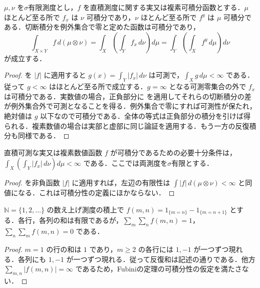 \begin{prop}[Fubiniの定理]
$\mu,\nu$ を$\sigma$有限測度とし，$f$ を直積測度に関する実又は複素可積分函数とする．$\mu$ ほとんど至る所で $f_x$ は $\nu$ 可積分であり，$\nu$ ほとんど至る所で $f^y$ は $\mu$ 可積分である．切断積分を例外集合で零と定めた函数は可積分であり，
\[
\int_{X\times Y}f\,d(\mu\otimes\nu)=\int_X\left(\int_Y f_x\,d\nu\right)d\mu=\int_Y\left(\int_X f^y\,d\mu\right)d\nu
\]
が成立する．
\end{prop}
\begin{proof}
 を $|f|$ に適用すると $g(x)=\int_Y |f_x|\,d\nu$ は可測で，$\int_X g\,d\mu<\infty$ である．従って $g<\infty$ はほとんど至る所で成立する．$g=\infty$ となる可測零集合の外で $f_x$ は可積分である．実数値の場合，正負部分に  を適用してそれらの切断積分の差が例外集合外で可測となることを得る．例外集合で零にすれば可測性が保たれ，絶対値は $g$ 以下なので可積分である．全体の等式は正負部分の積分を引けば得られる．複素数値の場合は実部と虚部に同じ論証を適用する．もう一方の反復積分も同様である．
\end{proof}
\begin{prop}[積分可能性の切断判定]
直積可測な実又は複素数値函数 $f$ が可積分であるための必要十分条件は，$\int_X(\int_Y|f_x|\,d\nu)d\mu<\infty$ である．ここでは両測度を$\sigma$有限とする．
\end{prop}
\begin{proof}
 を非負函数 $|f|$ に適用すれば，左辺の有限性は $\int|f|\,d(\mu\otimes\nu)<\infty$ と同値になる．これは可積分性の定義にほかならない．
\end{proof}
\begin{example}[絶対可積分性がない反復積分]
$\mathbb N=\{1,2,\ldots\}$ の数え上げ測度の積上で $f(m,n)=1_{\{m=n\}}-1_{\{m=n+1\}}$ とする．各行，各列の和は有限であるが，$\sum_m\sum_n f(m,n)=1$，$\sum_n\sum_m f(m,n)=0$ である．
\end{example}
\begin{proof}
$m=1$ の行の和は $1$ であり，$m\geq2$ の各行には $1,-1$ が一つずつ現れる．各列にも $1,-1$ が一つずつ現れる．従って反復和は記述の通りである．他方 $\sum_{m,n}|f(m,n)|=\infty$ であるため，Fubiniの定理の可積分性の仮定を満たさない．
\end{proof}
